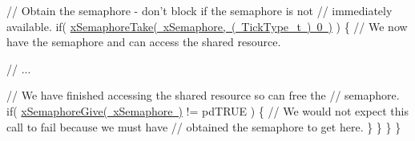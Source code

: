 \begin{DoxyPre}       // Obtain the semaphore - don't block if the semaphore is not
       // immediately available.
       if( \mbox{\hyperlink{semphr_8h_af116e436d2a5ae5bd72dbade2b5ea930}{xSemaphoreTake( xSemaphore, ( TickType\_t ) 0 )}} )
       \{
           // We now have the semaphore and can access the shared resource.\end{DoxyPre}



\begin{DoxyPre}           // ...\end{DoxyPre}



\begin{DoxyPre}           // We have finished accessing the shared resource so can free the
           // semaphore.
           if( \mbox{\hyperlink{semphr_8h_aae55761cabfa9bf85c8f4430f78c0953}{xSemaphoreGive( xSemaphore )}} != pdTRUE )
           \{
               // We would not expect this call to fail because we must have
               // obtained the semaphore to get here.
           \}
       \}
   \}
\}
\end{DoxyPre}
 